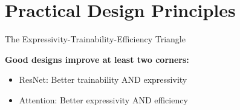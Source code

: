 \documentclass[xcolor=svgnames, 10pt, handout, standalone]{beamer}
\newcommand{\1}{\mathbf{1}}
\begin{document}
\section{Practical Design Principles}

\begin{frame}{The Expressivity-Trainability-Efficiency Triangle}
\begin{center}
\end{center}

\pause
\textbf{Good designs improve at least two corners:}
\begin{itemize}
    \item ResNet: Better trainability AND expressivity
    \item Attention: Better expressivity AND efficiency
\end{itemize}
\end{frame}
\end{document}
